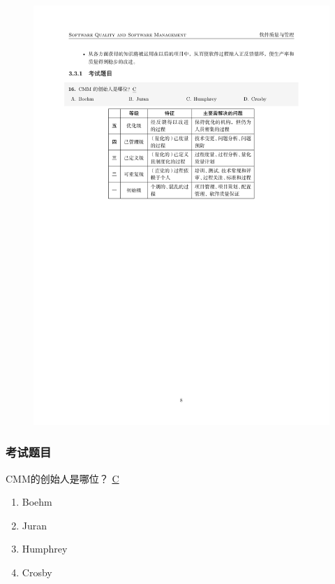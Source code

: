 \begin{figure}[H]
{\begin{minipage}[t]{0.56\linewidth}
	\includegraphics[width=\linewidth]{images/CMM2.pdf}
	\end{minipage}
	}
	\centering
\end{figure}


\subsubsection{考试题目}
\begin{problem}
	CMM的创始人是哪位？
	\uline{C}    
    \vspace{-0.8em}
    \begin{multicols}{4}
        \begin{enumerate}[label=\Alph*.]
            \item Boehm
            \item Juran
            \item Humphrey
            \item Crosby
        \end{enumerate}
    \end{multicols}
    \vspace{-1em}
\end{problem}


